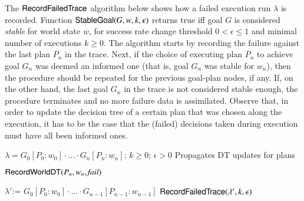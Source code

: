 The $\mathsf{RecordFailedTrace}$ algorithm below shows how a failed execution run $\lambda$ is
recorded. Function
$\mathsf{StableGoal}(G,w,k,\epsilon)$ returns true iff goal $G$ is considered \textit{stable} for world state $w$, for success rate change 
threshold $0 < \epsilon \leq 1$ and minimal number of executions $k
\geq 0$.
%
The algorithm starts by recording the failure against the last plan $P_n$ in the
trace.
Next, if the choice of executing plan $P_n$ to achieve goal $G_n$ was deemed an
informed one (that is, goal $G_n$ was stable for $w_n$), then the procedure
should be repeated for the previous goal-plan nodes, if any.
If, on the other hand, the last goal $G_n$ in the trace is not considered stable
enough, the procedure terminates and no more failure data is assimilated.
Observe that, in order to update the decision tree of a certain plan that was
chosen along the execution, it has to be the case that the (failed) decisions
taken during execution must have all been informed ones.
 
 \renewcommand{\algorithmiccomment}[1]{\hfill \texttt{\small // #1}}
 \newcommand{\assign}{\mbox{:=\ }}
 \begin{algorithm}[h]
	\caption{$\RecordTrace(\lambda,k,\epsilon)$}\label{algo:record_failed_exec}
	\label{alg:NDS}
  \begin{algorithmic}[1]
    \REQUIRE $\lambda=G_0[P_0:w_0] \cdot \ldots \cdot G_n[P_n:w_n]$; $k\geq0$;
    $\epsilon > 0$ \ENSURE Propagates DT updates for plans

	\STATE $\mathsf{RecordWorldDT}(P_n,w_n,\mbox{\emph{fail}})$

    	 \STATE $\lambda' \assign G_0[P_0:w_0] \cdot \ldots \cdot
    				G_{n-1}[P_{n-1}:w_{n-1}]$
    	\STATE $\mathsf{RecordFailedTrace}(\lambda',k,\epsilon)$ 
    \ENDIF
  \end{algorithmic}
\end{algorithm}

 



